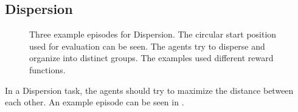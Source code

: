 \subsection{Dispersion}
\begin{figure}[htp]
    \centering
    \hspace{1cm}                       
    \caption{Three example episodes for Dispersion. The circular start position used for evaluation can be seen. The agents try to disperse and organize into distinct groups. The examples used different reward functions.}
    \label{fig:dispersion_example}
\end{figure}

In a Dispersion task, the agents should try to maximize the distance between each other. An example episode can be seen in .\par

